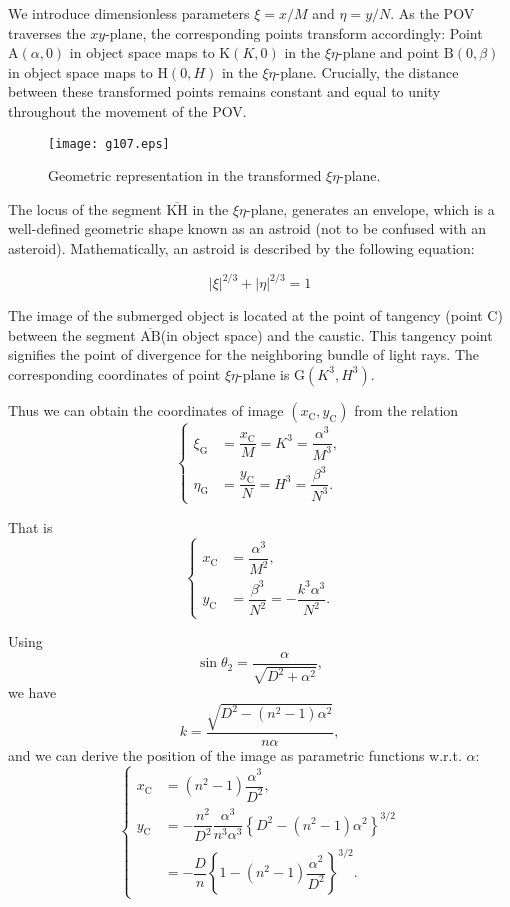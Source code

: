 \documentclass[twocolumn]{article}
\begin{document}
We introduce dimensionless parameters $\xi=x/M$ and $\eta=y/N$. 
As the POV traverses the $xy$-plane, the corresponding points transform accordingly:
Point $\mathrm{A}(\alpha, 0)$ in object space maps to $\mathrm{K}(K, 0)$ in the $\xi\eta$-plane 
and point $\mathrm{B}(0, \beta)$ in object space maps to $\mathrm{H}(0, H)$ in the $\xi\eta$-plane. 
Crucially, the distance between these transformed points remains constant and equal 
to unity throughout the movement of the POV.

\begin{figure}[htbp]
	\centering
	\texttt{[image: g107.eps]}
	\caption{Geometric representation in the transformed $\xi\eta$-plane.} 
\end{figure}

The locus of the segment $\overline{\mathrm{KH}}$ in the $\xi\eta$-plane, generates an envelope, which is a 
well-defined geometric shape known as an astroid (not to be confused with an asteroid). 
Mathematically, an astroid is described by the following equation:

$$ \left| \xi \right|^{2/3} + \left| \eta \right|^{2/3} = 1 $$

The image of the submerged object is located at the point of tangency (point $\mathrm{C}$) 
between the segment $\overline{\mathrm{AB}}$(in object space) and the caustic. 
This tangency point signifies the point of divergence for the 
neighboring bundle of light rays. The corresponding coordinates of point $\xi\eta$-plane is 
$\mathrm{G}(K^3, H^3)$.

Thus we can obtain the coordinates of image $(x_{\mathrm{C}}^{}, y_{\mathrm{C}}^{})$ 
from the relation
$$ \left\{ 
\begin{aligned}
	\xi_{\mathrm{G}}^{} &= \dfrac{x_{\mathrm{C}}^{}}{M} = K^3 = \dfrac{\alpha^3}{M^3},\\
	\eta_{\mathrm{G}}^{} &= \dfrac{y_{\mathrm{C}}^{}}{N} = H^3 = \dfrac{\beta^3}{N^3}.
\end{aligned}
\right.$$

That is
$$ \left\{ 
\begin{aligned}
	x_{\mathrm{C}}^{} &= \dfrac{\alpha^3}{M^2},\\
	y_{\mathrm{C}}^{} &= \dfrac{\beta^3}{N^2}=-\dfrac{k^3\alpha^3}{N^2}.
\end{aligned}
\right.$$

Using 
$$\sin\theta_2 = \dfrac{\alpha}{\sqrt{D^2+\alpha^2}},$$
we have
$$k = \dfrac{\sqrt{D^2-(n^2-1)\alpha^2}}{n\alpha},$$
and we can derive the position of the image as parametric functions w.r.t. $\alpha$:
$$ \left\{ 
\begin{aligned}
	x_{\mathrm{C}}^{} &= (n^2-1)\dfrac{\alpha^3}{D^2},\\
	y_{\mathrm{C}}^{} &= -\dfrac{n^2}{D^2}\dfrac{\alpha^3}{n^3\alpha^3}\left\{ D^2-(n^2-1)\alpha^2 \right\}^{3/2}\\
	&=-\dfrac{D}{n}\left\{ 1-(n^2-1)\dfrac{\alpha^2}{D^2} \right\}^{3/2}.
\end{aligned}
\right.$$
\end{document}
